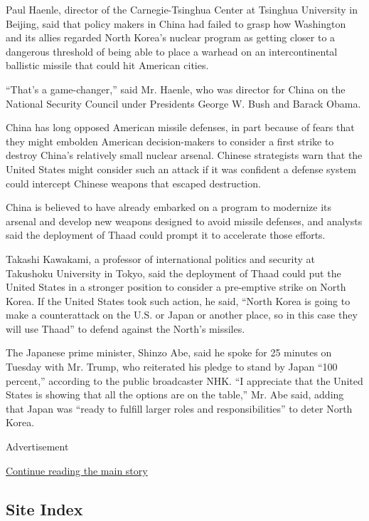 Paul Haenle, director of the Carnegie-Tsinghua Center at Tsinghua
University in Beijing, said that policy makers in China had failed to
grasp how Washington and its allies regarded North Korea's nuclear
program as getting closer to a dangerous threshold of being able to
place a warhead on an intercontinental ballistic missile that could hit
American cities.

``That's a game-changer,'' said Mr. Haenle, who was director for China
on the National Security Council under Presidents George W. Bush and
Barack Obama.

China has long opposed American missile defenses, in part because of
fears that they might embolden American decision-makers to consider a
first strike to destroy China's relatively small nuclear arsenal.
Chinese strategists warn that the United States might consider such an
attack if it was confident a defense system could intercept Chinese
weapons that escaped destruction.

China is believed to have already embarked on a program to modernize its
arsenal and develop new weapons designed to avoid missile defenses, and
analysts said the deployment of Thaad could prompt it to accelerate
those efforts.

Takashi Kawakami, a professor of international politics and security at
Takushoku University in Tokyo, said the deployment of Thaad could put
the United States in a stronger position to consider a pre-emptive
strike on North Korea. If the United States took such action, he said,
``North Korea is going to make a counterattack on the U.S. or Japan or
another place, so in this case they will use Thaad'' to defend against
the North's missiles.

The Japanese prime minister, Shinzo Abe, said he spoke for 25 minutes on
Tuesday with Mr. Trump, who reiterated his pledge to stand by Japan
``100 percent,'' according to the public broadcaster NHK. ``I appreciate
that the United States is showing that all the options are on the
table,'' Mr. Abe said, adding that Japan was ``ready to fulfill larger
roles and responsibilities'' to deter North Korea.

Advertisement

\protect\hyperlink{after-bottom}{Continue reading the main story}

\hypertarget{site-index}{%
\subsection{Site Index}\label{site-index}}

